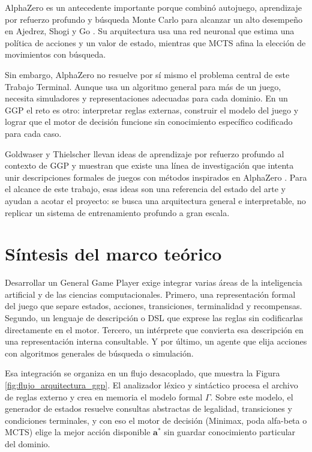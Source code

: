 AlphaZero es un antecedente importante porque combinó autojuego, aprendizaje por refuerzo profundo y búsqueda Monte Carlo para alcanzar un alto desempeño en Ajedrez, Shogi y Go \cite{Silver2018AlphaZero}. Su arquitectura usa una red neuronal que estima una política de acciones y un valor de estado, mientras que MCTS afina la elección de movimientos con búsqueda.

Sin embargo, AlphaZero no resuelve por sí mismo el problema central de este Trabajo Terminal. Aunque usa un algoritmo general para más de un juego, necesita simuladores y representaciones adecuadas para cada dominio. En un GGP el reto es otro: interpretar reglas externas, construir el modelo del juego y lograr que el motor de decisión funcione sin conocimiento específico codificado para cada caso.

Goldwaser y Thielscher llevan ideas de aprendizaje por refuerzo profundo al contexto de GGP y muestran que existe una línea de investigación que intenta unir descripciones formales de juegos con métodos inspirados en AlphaZero \cite{Goldwaser2020DRLGGP}. Para el alcance de este trabajo, esas ideas son una referencia del estado del arte y ayudan a acotar el proyecto: se busca una arquitectura general e interpretable, no replicar un sistema de entrenamiento profundo a gran escala.

\section{Síntesis del marco teórico}

Desarrollar un General Game Player exige integrar varias áreas de la inteligencia artificial y de las ciencias computacionales. Primero, una representación formal del juego que separe estados, acciones, transiciones, terminalidad y recompensas. Segundo, un lenguaje de descripción o DSL que exprese las reglas sin codificarlas directamente en el motor. Tercero, un intérprete que convierta esa descripción en una representación interna consultable. Y por último, un agente que elija acciones con algoritmos generales de búsqueda o simulación.

Esa integración se organiza en un flujo desacoplado, que muestra la Figura \ref{fig:flujo_arquitectura_ggp}. El analizador léxico y sintáctico procesa el archivo de reglas externo y crea en memoria el modelo formal $\Gamma$. Sobre este modelo, el generador de estados resuelve consultas abstractas de legalidad, transiciones y condiciones terminales, y con eso el motor de decisión (Minimax, poda alfa-beta o MCTS) elige la mejor acción disponible $\mathbf{a}^*$ sin guardar conocimiento particular del dominio.

